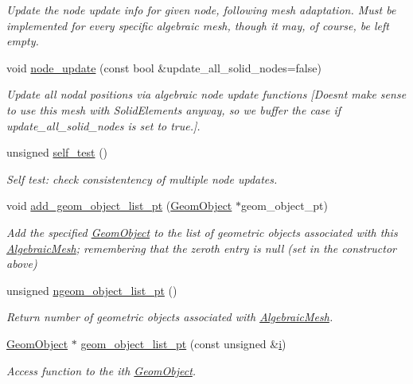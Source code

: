 \begin{DoxyCompactItemize}
\begin{DoxyCompactList}\small\item\em Update the node update info for given node, following mesh adaptation. Must be implemented for every specific algebraic mesh, though it may, of course, be left empty. \end{DoxyCompactList}\item 
void \hyperlink{classoomph_1_1AlgebraicMesh_ad3a5638cacb6df1a47c475bb177b6ed7}{node\+\_\+update} (const bool \&update\+\_\+all\+\_\+solid\+\_\+nodes=false)
\begin{DoxyCompactList}\small\item\em Update all nodal positions via algebraic node update functions \mbox{[}Doesn\textquotesingle{}t make sense to use this mesh with Solid\+Elements anyway, so we buffer the case if update\+\_\+all\+\_\+solid\+\_\+nodes is set to true.\mbox{]}. \end{DoxyCompactList}\item 
unsigned \hyperlink{classoomph_1_1AlgebraicMesh_adfac67a6cb78db3955e20a241f2f4df4}{self\+\_\+test} ()
\begin{DoxyCompactList}\small\item\em Self test\+: check consistentency of multiple node updates. \end{DoxyCompactList}\item 
void \hyperlink{classoomph_1_1AlgebraicMesh_ae3be691428fed5ec4b60cc5b7f7db49f}{add\+\_\+geom\+\_\+object\+\_\+list\+\_\+pt} (\hyperlink{classoomph_1_1GeomObject}{Geom\+Object} $\ast$geom\+\_\+object\+\_\+pt)
\begin{DoxyCompactList}\small\item\em Add the specified \hyperlink{classoomph_1_1GeomObject}{Geom\+Object} to the list of geometric objects associated with this \hyperlink{classoomph_1_1AlgebraicMesh}{Algebraic\+Mesh}; remembering that the zeroth entry is null (set in the constructor above) \end{DoxyCompactList}\item 
unsigned \hyperlink{classoomph_1_1AlgebraicMesh_ab6a636ffb928e10e004747988fb03404}{ngeom\+\_\+object\+\_\+list\+\_\+pt} ()
\begin{DoxyCompactList}\small\item\em Return number of geometric objects associated with \hyperlink{classoomph_1_1AlgebraicMesh}{Algebraic\+Mesh}. \end{DoxyCompactList}\item 
\hyperlink{classoomph_1_1GeomObject}{Geom\+Object} $\ast$ \hyperlink{classoomph_1_1AlgebraicMesh_aad2902d3afa811449f484d3174f19a5e}{geom\+\_\+object\+\_\+list\+\_\+pt} (const unsigned \&\hyperlink{cfortran_8h_adb50e893b86b3e55e751a42eab3cba82}{i})
\begin{DoxyCompactList}\small\item\em Access function to the ith \hyperlink{classoomph_1_1GeomObject}{Geom\+Object}. \end{DoxyCompactList}\end{DoxyCompactItemize}

